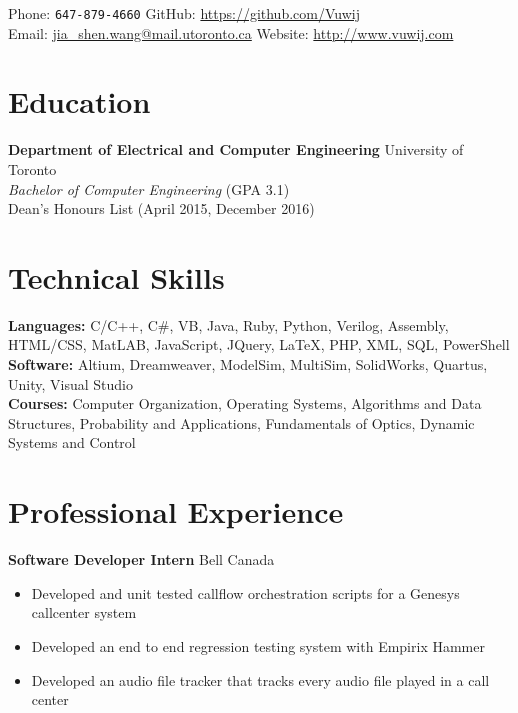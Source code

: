 \documentclass[10pt, a4paper]{cv}
\begin{document}

Phone: \texttt{647-879-4660} \hfill
GitHub: \href{https://github.com/Vuwij}{https://github.com/Vuwij}\\
Email: \href{mailto:jia\_shen.wang@mail.utoronto.ca}{jia\_shen.wang@mail.utoronto.ca}\hfill
Website: \href{http://www.vuwij.com}{http://www.vuwij.com}\\

\section*{Education}
\textbf{Department of Electrical and Computer Engineering} \hfill University of Toronto\\
\emph{Bachelor of Computer Engineering} \small{\textsc{(GPA 3.1)}}\\[0.1mm]
\small Dean's Honours List (April 2015, December 2016)

\section*{Technical Skills}
\textbf{Languages:} C/C++, C\#, VB, Java, Ruby, Python, Verilog, Assembly, HTML/CSS, MatLAB, JavaScript, JQuery, LaTeX, PHP, XML, SQL, PowerShell\\[0.2em]
\textbf{Software:} Altium, Dreamweaver, ModelSim, MultiSim, SolidWorks, Quartus, Unity, Visual Studio\\[0.2em]
\textbf{Courses:} Computer Organization, Operating Systems, Algorithms and Data Structures, Probability and Applications, Fundamentals of Optics, Dynamic Systems and Control

\section*{Professional Experience}\noindent

	\textbf{Software Developer Intern} \hfill Bell Canada
	\begin{itemize}
		\item Developed and unit tested callflow orchestration scripts for a Genesys callcenter system
		\item Developed an end to end regression testing system with Empirix Hammer
		\item Developed an audio file tracker that tracks every audio file played in a call center
	\end{itemize}
	
\end{document}
